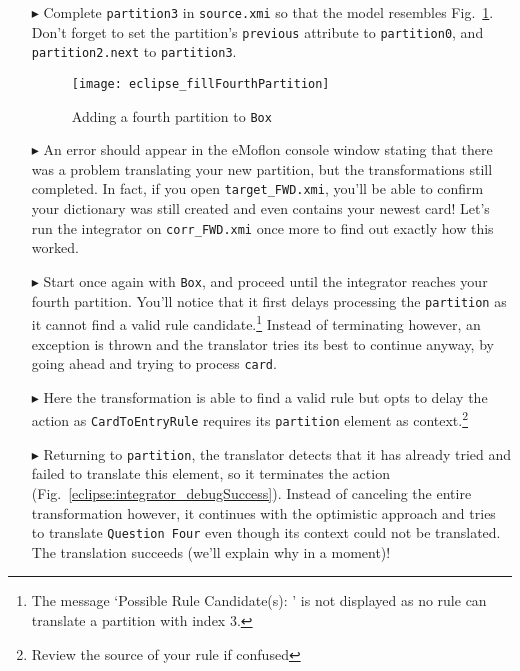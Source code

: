 \begin{itemize}

\item[$\blacktriangleright$] Complete \texttt{partition3} in \texttt{source.xmi} so that the model resembles Fig.~\ref{eclipse:fourthPartitionStart}. Don't
forget to set the partition's \texttt{previous} attribute to \texttt{partition0}, and \texttt{partition2.next} to \texttt{partition3}.

\begin{figure}[htbp]
\begin{center}
  \texttt{[image: eclipse\_fillFourthPartition]}
  \caption{Adding a fourth partition to \texttt{Box}}
  \label{eclipse:fourthPartitionStart}
\end{center}
\end{figure}

\item[$\blacktriangleright$] An error should appear in the eMoflon console window stating that there was a problem translating your new partition, but the
transformations still completed. In fact, if you open \texttt{target\_FWD.xmi}, you'll be able to confirm your dictionary was still created and even
contains your newest card! Let's run the integrator on \texttt{corr\_FWD.xmi} once more to find out exactly how this worked.

\item[$\blacktriangleright$] Start once again with \texttt{Box}, and proceed until the integrator reaches your fourth partition. You'll notice that it
first delays processing the \texttt{partition} as it cannot find a valid rule candidate.\footnote{The message `Possible Rule Candidate(s): ' is not displayed
as no rule can translate a partition with index 3.} Instead of terminating however, an exception is thrown and the translator tries its best to continue anyway,
by going ahead and trying to process \texttt{card}.

\item[$\blacktriangleright$] Here the transformation is able to find a valid rule but opts to delay the action as \texttt{CardToEntryRule} requires its
\texttt{partition} element as context.\footnote{Review the source of your rule if confused}

\item[$\blacktriangleright$] Returning to \texttt{partition}, the translator detects that it has already tried and failed to translate this element, so it
terminates the action (Fig.~\ref{eclipse:integrator_debugSuccess}). Instead of canceling the entire transformation however, it continues with the optimistic
approach and tries to translate \texttt{Question Four} even though its context could not be translated. The translation succeeds (we'll explain why in a
moment)!


\end{itemize}
